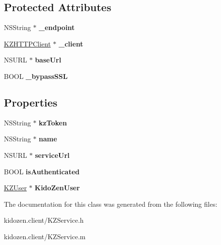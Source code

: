 \subsection*{Protected Attributes}
\begin{DoxyCompactItemize}
\item 
\hypertarget{interface_k_z_service_afafc141156ae4261410c17eeaa8014b3}{N\-S\-String $\ast$ {\bfseries \-\_\-endpoint}}\label{interface_k_z_service_afafc141156ae4261410c17eeaa8014b3}

\item 
\hypertarget{interface_k_z_service_a3d26c328bc00f3eab6f212261a459d52}{\hyperlink{interface_k_z_h_t_t_p_client}{K\-Z\-H\-T\-T\-P\-Client} $\ast$ {\bfseries \-\_\-client}}\label{interface_k_z_service_a3d26c328bc00f3eab6f212261a459d52}

\item 
\hypertarget{interface_k_z_service_a1a185457dab1c6e9f015bbea50f66ec9}{N\-S\-U\-R\-L $\ast$ {\bfseries base\-Url}}\label{interface_k_z_service_a1a185457dab1c6e9f015bbea50f66ec9}

\item 
\hypertarget{interface_k_z_service_a85421e93385141947a27fd090d8b3b1f}{B\-O\-O\-L {\bfseries \-\_\-bypass\-S\-S\-L}}\label{interface_k_z_service_a85421e93385141947a27fd090d8b3b1f}

\end{DoxyCompactItemize}
\subsection*{Properties}
\begin{DoxyCompactItemize}
\item 
\hypertarget{interface_k_z_service_a186061dd860ab05fd30cfcb3975dd05e}{N\-S\-String $\ast$ {\bfseries kz\-Token}}\label{interface_k_z_service_a186061dd860ab05fd30cfcb3975dd05e}

\item 
\hypertarget{interface_k_z_service_a87727a0d468bf42f626e3e5527a73497}{N\-S\-String $\ast$ {\bfseries name}}\label{interface_k_z_service_a87727a0d468bf42f626e3e5527a73497}

\item 
\hypertarget{interface_k_z_service_abf50dc7d9c86a6dc365070f9f80f0bb3}{N\-S\-U\-R\-L $\ast$ {\bfseries service\-Url}}\label{interface_k_z_service_abf50dc7d9c86a6dc365070f9f80f0bb3}

\item 
\hypertarget{interface_k_z_service_a91ab04a43ff32ba22b4b2d93f8d6737e}{B\-O\-O\-L {\bfseries is\-Authenticated}}\label{interface_k_z_service_a91ab04a43ff32ba22b4b2d93f8d6737e}

\item 
\hypertarget{interface_k_z_service_a3d4247038cf8d03ebafe648768acc58e}{\hyperlink{interface_k_z_user}{K\-Z\-User} $\ast$ {\bfseries Kido\-Zen\-User}}\label{interface_k_z_service_a3d4247038cf8d03ebafe648768acc58e}

\end{DoxyCompactItemize}


The documentation for this class was generated from the following files\-:\begin{DoxyCompactItemize}
\item 
kidozen.\-client/K\-Z\-Service.\-h\item 
kidozen.\-client/K\-Z\-Service.\-m\end{DoxyCompactItemize}
